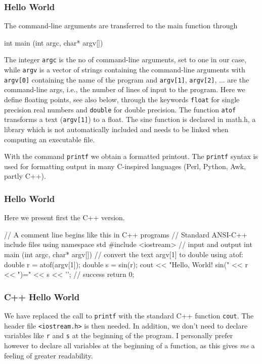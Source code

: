 \documentclass[handout]{beamer}
\newenvironment{block_mdfboxadmon}[1][]{\begin{block}{#1}}{\end{block}}
\begin{document}
\begin{frame}
\frametitle{Hello World}

\begin{block_mdfboxadmon}[Dissection II.]
The command-line arguments are transferred to the main function through

\begin{print}
   int main (int argc, char* argv[])
\end{print}
The integer \Verb!argc! is the no of command-line arguments, set to
one in our case, while
\Verb!argv! is a vector of strings containing the command-line arguments
with \Verb!argv[0]! containing  the name of the program
and \Verb!argv[1]!, \Verb!argv[2]!, ... are the command-line args, i.e., the number of
lines of input to the program.
Here we define floating points, see also below,
through the keywords \Verb!float! for single precision real numbers and
\Verb!double! for double precision. The function
\Verb!atof! transforms a text (\Verb!argv[1]!) to a float.
The sine function is declared in math.h, a library which
is not automatically included and needs to be linked when computing
an executable file.

With the command \Verb!printf! we obtain a formatted printout.
The \Verb!printf! syntax is used for formatting output
in many C-inspired languages (Perl, Python, Awk, partly C++).
\end{block_mdfboxadmon}
\end{frame}

\begin{frame}
\frametitle{Hello World}

\begin{block_mdfboxadmon}[Now in C++.]
Here we present first the C++ version.

\begin{print}
// A comment line begins like this in C++ programs
// Standard ANSI-C++ include files
using namespace std
#include <iostream>  // input and output
int main (int argc, char* argv[])
{
  // convert the text argv[1] to double using atof:
  double r = atof(argv[1]);
  double s = sin(r);
  cout << "Hello, World! sin(" << r << ")=" << s << '\n';
  // success
  return 0;
}
\end{print}
\end{block_mdfboxadmon}
\end{frame}

\begin{frame}
\frametitle{C++ Hello World}

\begin{block_mdfboxadmon}[Dissection I.]
We have replaced the call to \Verb!printf! with the standard C++ function
\Verb!cout!. The header file \Verb!<iostream.h>! is then needed.
In addition, we don't need to
declare variables like \Verb!r! and \Verb!s!  at the beginning of the program.
I personally prefer
however to declare all variables at the beginning of a function, as this
gives \emph{me} a feeling of greater readability.
\end{block_mdfboxadmon}
\end{frame}
\end{document}
